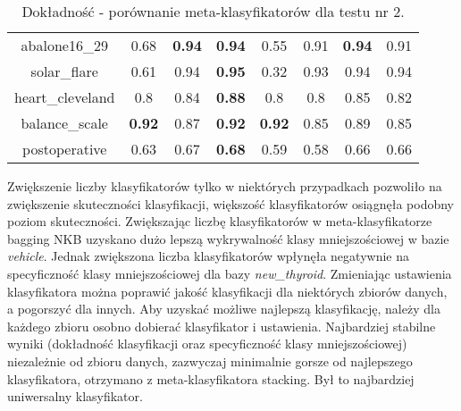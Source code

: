 \begin{table}[H]
\begin{center}
{\begin{tabular}{c|ccccccc}
				abalone16\_29&0.68&\textbf{0.94}&\textbf{0.94}&0.55&0.91&\textbf{0.94}&0.91\\%
				solar\_flare&0.61&0.94&\textbf{0.95}&0.32&0.93&0.94&0.94\\%
				heart\_cleveland&0.8&0.84&\textbf{0.88}&0.8&0.8&0.85&0.82\\%
				balance\_scale&\textbf{0.92}&0.87&\textbf{0.92}&\textbf{0.92}&0.85&0.89&0.85\\%
				postoperative&0.63&0.67&\textbf{0.68}&0.59&0.58&0.66&0.66\\%
			\end{tabular}}
			\caption{Dokładność - porównanie meta-klasyfikatorów dla testu nr 2.}
			\label{accmeta2}
		\end{center}
	\end{table}
Zwiększenie liczby klasyfikatorów tylko w niektórych przypadkach pozwoliło na zwiększenie skuteczności klasyfikacji, większość klasyfikatorów osiągnęła podobny poziom skuteczności. Zwiększając liczbę klasyfikatorów w meta-klasyfikatorze bagging NKB uzyskano dużo lepszą wykrywalność klasy mniejszościowej w bazie \textit{vehicle}. Jednak zwiększona liczba klasyfikatorów wpłynęła negatywnie na specyficzność klasy mniejszościowej dla bazy \textit{new\_thyroid}. Zmieniając ustawienia klasyfikatora można poprawić jakość klasyfikacji dla niektórych zbiorów danych, a pogorszyć dla innych. Aby uzyskać możliwe najlepszą klasyfikację, należy dla każdego zbioru osobno dobierać klasyfikator i ustawienia. Najbardziej stabilne wyniki (dokładność klasyfikacji oraz specyficzność klasy mniejszościowej) niezależnie od zbioru danych, zazwyczaj minimalnie gorsze od najlepszego klasyfikatora, otrzymano z meta-klasyfikatora stacking. Był to najbardziej uniwersalny klasyfikator.

